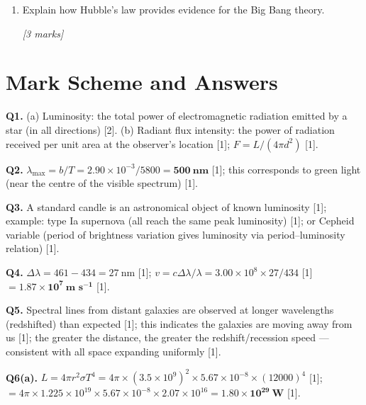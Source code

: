\begin{tcolorbox}[colback=white, colframe=midblue, breakable]
\begin{enumerate}[label=(\alph*)]
  \item \begin{minipage}[t]{\linewidth}
  Explain how Hubble's law provides evidence for the Big Bang theory.
  \par\hfill\textit{[3 marks]}
  \vspace{4.0cm}
  \end{minipage}
\end{enumerate}

\end{tcolorbox}

\section{Mark Scheme and Answers}

\begin{markscheme}

\textbf{Q1.} (a) Luminosity: the total power of electromagnetic radiation emitted by a star (in all directions) [2]. (b) Radiant flux intensity: the power of radiation received per unit area at the observer's location [1]; $F = L/(4\pi d^2)$ [1].

\vspace{0.5em}\textbf{Q2.} $\lambda_{\max} = b/T = 2.90\times10^{-3}/5800 = \mathbf{500\ \text{nm}}$ [1]; this corresponds to green light (near the centre of the visible spectrum) [1].

\vspace{0.5em}\textbf{Q3.} A standard candle is an astronomical object of known luminosity [1]; example: type Ia supernova (all reach the same peak luminosity) [1]; or Cepheid variable (period of brightness variation gives luminosity via period--luminosity relation) [1].

\vspace{0.5em}\textbf{Q4.} $\Delta\lambda = 461 - 434 = 27\ \text{nm}$ [1]; $v = c\Delta\lambda/\lambda = 3.00\times10^8 \times 27/434$ [1] $= \mathbf{1.87\times10^7\ \text{m s}^{-1}}$ [1].

\vspace{0.5em}\textbf{Q5.} Spectral lines from distant galaxies are observed at longer wavelengths (redshifted) than expected [1]; this indicates the galaxies are moving away from us [1]; the greater the distance, the greater the redshift/recession speed — consistent with all space expanding uniformly [1].

\vspace{0.5em}\textbf{Q6(a).} $L = 4\pi r^2\sigma T^4 = 4\pi\times(3.5\times10^9)^2\times5.67\times10^{-8}\times(12000)^4$ [1]; $= 4\pi\times1.225\times10^{19}\times5.67\times10^{-8}\times2.07\times10^{16} = \mathbf{1.80\times10^{29}\ \text{W}}$ [1].


\end{markscheme}
